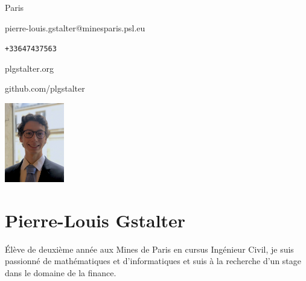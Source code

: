 \documentclass{article}
\begin{document}
\begin{multicols}{3}

Paris

pierre-louis.gstalter@minesparis.psl.eu

\texttt{+33647437563}

plgstalter.org

github.com/plgstalter

\columnbreak

	\hfill\includegraphics[width=2.6cm]{photo.jpeg}

\columnbreak

{\color{blue} \section*{Pierre-Louis Gstalter}}

\noindent Élève de deuxième année aux Mines de Paris en cursus Ingénieur Civil, je suis passionné de mathématiques et d'informatiques et suis à la recherche d'un stage dans le domaine de la finance.
\end{multicols}
\end{document}
